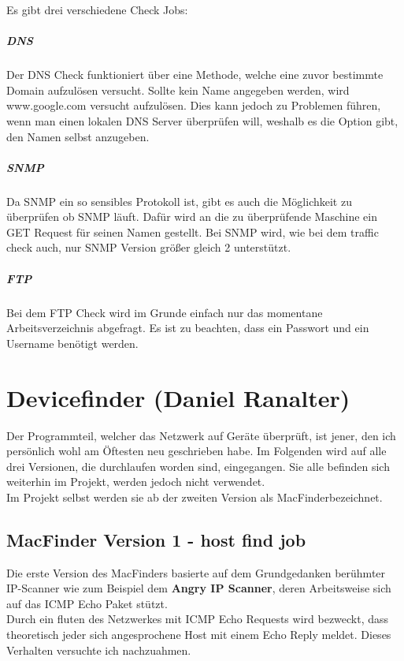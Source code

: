 \documentclass[12pt,a4paper]{report}
\begin{document}
\begin{onehalfspace}
Es gibt drei verschiedene Check Jobs:\\
\paragraph{DNS}
Der DNS Check funktioniert über eine Methode, welche eine zuvor bestimmte Domain aufzulösen versucht. Sollte kein Name angegeben werden, wird www.google.com versucht aufzulösen. Dies kann jedoch zu Problemen führen, wenn man einen lokalen DNS Server überprüfen will, weshalb es die Option gibt, den Namen selbst anzugeben.

\paragraph{SNMP}
Da SNMP ein so sensibles Protokoll ist, gibt es auch die Möglichkeit zu überprüfen ob SNMP läuft. Dafür wird an die zu überprüfende Maschine ein GET Request für seinen Namen gestellt. Bei SNMP wird, wie bei dem traffic check auch, nur SNMP Version größer gleich 2 unterstützt.

\paragraph{FTP}
Bei dem FTP Check wird im Grunde einfach nur das momentane Arbeitsverzeichnis abgefragt. Es ist zu beachten, dass ein Passwort und ein Username benötigt werden. 


\chapter{Devicefinder (Daniel Ranalter)}
Der Programmteil, welcher das Netzwerk auf Geräte überprüft, ist jener, den ich persönlich wohl am Öftesten neu geschrieben habe. Im Folgenden wird auf alle drei Versionen, die durchlaufen worden sind, eingegangen. Sie alle befinden sich weiterhin im Projekt, werden jedoch nicht verwendet.\\
Im Projekt selbst werden sie ab der zweiten Version als \glqq MacFinder\grqq bezeichnet. 
\section{MacFinder Version 1 - host find job}
Die erste Version des MacFinders basierte auf dem Grundgedanken berühmter IP-Scanner wie zum Beispiel dem \textbf{Angry IP Scanner}, deren Arbeitsweise sich auf das ICMP Echo Paket stützt.\\
Durch ein fluten des Netzwerkes mit ICMP Echo Requests wird bezweckt, dass theoretisch jeder sich angesprochene Host mit einem Echo Reply meldet. Dieses Verhalten versuchte ich nachzuahmen.\\


\end{onehalfspace}
\end{document}
